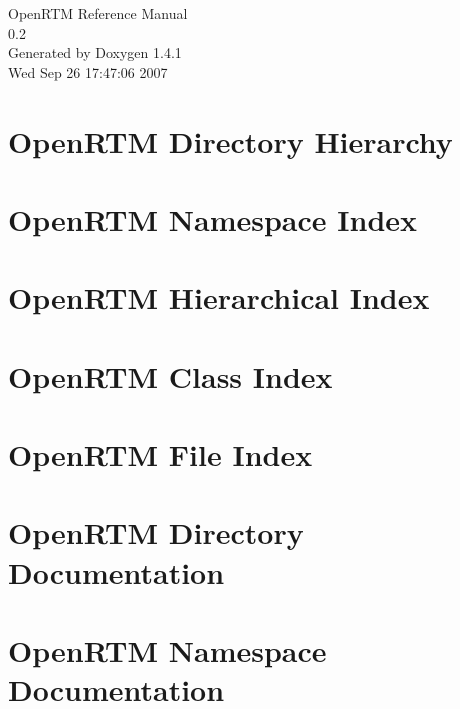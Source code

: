 \documentclass[a4paper]{book}
\begin{document}
\begin{titlepage}
\vspace*{7cm}
\begin{center}
{\Large Open\-RTM Reference Manual\\[1ex]\large 0.2 }\\
\vspace*{1cm}
{\large Generated by Doxygen 1.4.1}\\
\vspace*{0.5cm}
{\small Wed Sep 26 17:47:06 2007}\\
\end{center}
\end{titlepage}
\clearemptydoublepage
{}
\tableofcontents
\clearemptydoublepage
{}
\chapter{Open\-RTM Directory Hierarchy}

\chapter{Open\-RTM Namespace Index}

\chapter{Open\-RTM Hierarchical Index}

\chapter{Open\-RTM Class Index}

\chapter{Open\-RTM File Index}

\chapter{Open\-RTM Directory Documentation}


\chapter{Open\-RTM Namespace Documentation}


\end{document}

